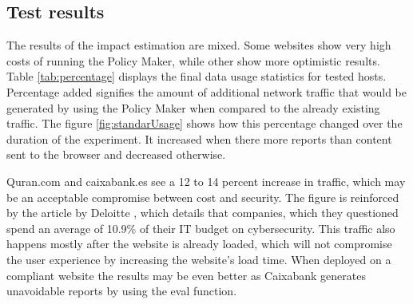 \subsection{Test results}

The results of the impact estimation are mixed. 
Some websites show very high costs of running the Policy Maker, while other show more optimistic results.
Table \ref{tab:percentage} displays the final data usage statistics for tested hosts.
Percentage added signifies the amount of additional network traffic that would be generated by using the Policy Maker when compared to the already existing traffic.
The figure \ref{fig:standarUsage} shows how this percentage changed over the duration of the experiment.
It increased when there more reports than content sent to the browser and decreased otherwise.

Quran.com and caixabank.es see a 12 to 14 percent increase in traffic, which may be an acceptable compromise between cost and security.
The figure is reinforced by the article by Deloitte \cite{secSpend}, which details that companies, which they questioned spend an average of 10.9\% of their IT budget on cybersecurity.
This traffic also happens mostly after the website is already loaded, which will not compromise the user experience by increasing the website's load time.
When deployed on a compliant website the results may be even better as Caixabank generates unavoidable reports by using the eval function.


